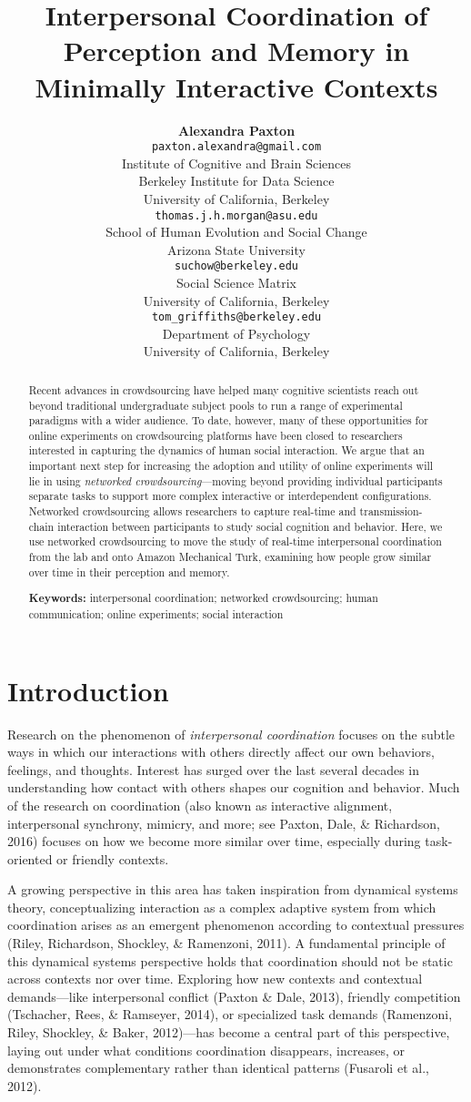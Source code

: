 \documentclass[10pt, letterpaper]{article}
\title{Interpersonal Coordination of Perception and Memory in Minimally
Interactive Contexts}
\author{{\large \bf Alexandra Paxton} \\ \texttt{paxton.alexandra@gmail.com} \\ Institute of Cognitive and Brain Sciences \\ Berkeley Institute for Data Science \\ University of California, Berkeley \And {\large \bf Thomas J. H. Morgan} \\ \texttt{thomas.j.h.morgan@asu.edu} \\ School of Human Evolution and Social Change \\ Arizona State University \AND {\large \bf Jordan W. Suchow} \\ \texttt{suchow@berkeley.edu} \\ Social Science Matrix \\ University of California, Berkeley \And {\large \bf Thomas L. Griffiths} \\ \texttt{tom\_griffiths@berkeley.edu} \\ Department of Psychology \\ University of California, Berkeley}
\begin{document}
\maketitle

\begin{abstract}
Recent advances in crowdsourcing have helped many cognitive scientists
reach out beyond traditional undergraduate subject pools to run a range
of experimental paradigms with a wider audience. To date, however, many
of these opportunities for online experiments on crowdsourcing platforms
have been closed to researchers interested in capturing the dynamics of
human social interaction. We argue that an important next step for
increasing the adoption and utility of online experiments will lie in
using \emph{networked crowdsourcing}---moving beyond providing
individual participants separate tasks to support more complex
interactive or interdependent configurations. Networked crowdsourcing
allows researchers to capture real-time and transmission-chain
interaction between participants to study social cognition and behavior.
Here, we use networked crowdsourcing to move the study of real-time
interpersonal coordination from the lab and onto Amazon Mechanical Turk,
examining how people grow similar over time in their perception and
memory.

\textbf{Keywords:}
interpersonal coordination; networked crowdsourcing; human
communication; online experiments; social interaction
\end{abstract}

\section{Introduction}\label{introduction}

Research on the phenomenon of \emph{interpersonal coordination} focuses
on the subtle ways in which our interactions with others directly affect
our own behaviors, feelings, and thoughts. Interest has surged over the
last several decades in understanding how contact with others shapes our
cognition and behavior. Much of the research on coordination (also known
as interactive alignment, interpersonal synchrony, mimicry, and more;
see Paxton, Dale, \& Richardson, 2016) focuses on how we become more
similar over time, especially during task-oriented or friendly contexts.

A growing perspective in this area has taken inspiration from dynamical
systems theory, conceptualizing interaction as a complex adaptive system
from which coordination arises as an emergent phenomenon according to
contextual pressures (Riley, Richardson, Shockley, \& Ramenzoni, 2011).
A fundamental principle of this dynamical systems perspective holds that
coordination should not be static across contexts nor over time.
Exploring how new contexts and contextual demands---like interpersonal
conflict (Paxton \& Dale, 2013), friendly competition (Tschacher, Rees,
\& Ramseyer, 2014), or specialized task demands (Ramenzoni, Riley,
Shockley, \& Baker, 2012)---has become a central part of this
perspective, laying out under what conditions coordination disappears,
increases, or demonstrates complementary rather than identical patterns
(Fusaroli et al., 2012).
\end{document}

